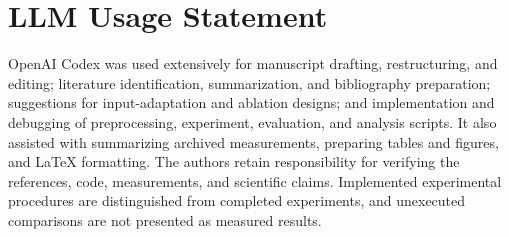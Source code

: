 \section*{LLM Usage Statement}
OpenAI Codex was used extensively for manuscript drafting, restructuring,
and editing; literature identification, summarization, and bibliography
preparation; suggestions for input-adaptation and ablation designs; and
implementation and debugging of preprocessing, experiment, evaluation, and
analysis scripts. It also assisted with summarizing archived measurements,
preparing tables and figures, and LaTeX formatting. The authors retain
responsibility for verifying the references, code, measurements, and scientific
claims. Implemented experimental procedures are distinguished from completed
experiments, and unexecuted comparisons are not presented as measured results.
